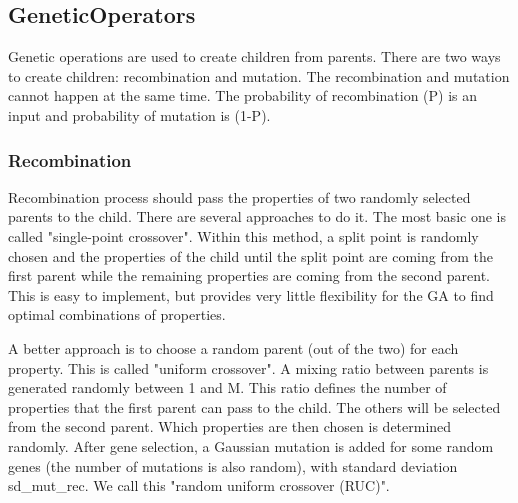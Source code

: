 \subsection{GeneticOperators} \label{geneticOperators}

Genetic operations are used to create children from parents. There are two ways to create children: recombination and mutation. The recombination and mutation cannot happen at the same time. The probability of recombination (P) is an input and probability of mutation is (1-P).

\subsubsection{Recombination}

Recombination process should pass the properties of two randomly selected parents to the child. There are several approaches to do it. The most basic one is called "single-point crossover". Within this method, a split point is randomly chosen and the properties of the child until the split point are coming from the first parent while the remaining properties are coming from the second parent. This is easy to implement, but provides very little flexibility for the GA to find optimal combinations of properties. %

A better approach is to choose a random parent (out of the two) for each property. This is called "uniform crossover". A mixing ratio between parents is generated randomly between 1 and M. This ratio defines the number of properties that the first parent can pass to the child. The others will be selected from the second parent. Which properties are then chosen is determined randomly. After gene selection, a Gaussian mutation is added for some random genes (the number of mutations is also random), with standard deviation sd_mut_rec.
We call this "random uniform crossover (RUC)".


